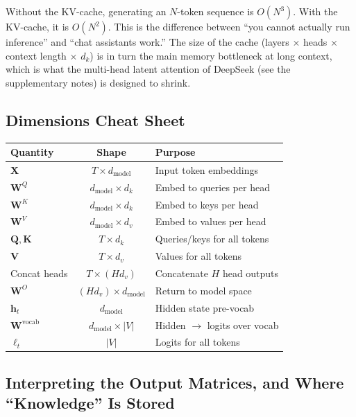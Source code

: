 \documentclass[11pt]{article}
\theoremstyle{remark}
\begin{document}
Without the KV-cache, generating an \(N\)-token sequence is \(O(N^3)\). With the KV-cache, it is \(O(N^2)\). This is the difference between ``you cannot actually run inference'' and ``chat assistants work.'' The size of the cache (layers \(\times\) heads \(\times\) context length \(\times\) \(d_k\)) is in turn the main memory bottleneck at long context, which is what the multi-head latent attention of DeepSeek (see the supplementary notes) is designed to shrink.

\subsection{Dimensions Cheat Sheet}
\begin{center}
\renewcommand{\arraystretch}{1.2}
\begin{tabular}{@{}lcl@{}}
\toprule
Quantity & Shape & Purpose \\
\midrule
\(\mathbf{X}\) & \(T\times d_{\text{model}}\) & Input token embeddings \\
\(\mathbf{W}^Q\) & \(d_{\text{model}}\times d_k\) & Embed to queries per head \\
\(\mathbf{W}^K\) & \(d_{\text{model}}\times d_k\) & Embed to keys per head \\
\(\mathbf{W}^V\) & \(d_{\text{model}}\times d_v\) & Embed to values per head \\
\(\mathbf{Q},\mathbf{K}\) & \(T\times d_k\) & Queries/keys for all tokens \\
\(\mathbf{V}\) & \(T\times d_v\) & Values for all tokens \\
Concat heads & \(T\times (H d_v)\) & Concatenate \(H\) head outputs \\
\(\mathbf{W}^O\) & \((H d_v)\times d_{\text{model}}\) & Return to model space \\
\(\mathbf{h}_t\) & \(d_{\text{model}}\) & Hidden state pre-vocab \\
\(\mathbf{W}^{\text{vocab}}\) & \(d_{\text{model}}\times |V|\) & Hidden \(\to\) logits over vocab \\
\(\boldsymbol{\ell}_t\) & \(|V|\) & Logits for all tokens \\
\bottomrule
\end{tabular}
\end{center}

\subsection{Interpreting the Output Matrices, and Where ``Knowledge'' Is Stored}
\end{document}
